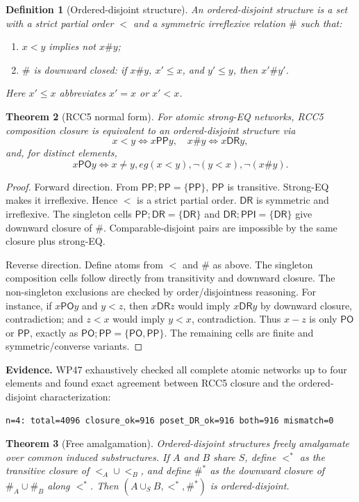 \documentclass[11pt]{article}
\newtheorem{theorem}{Theorem}[section]
\newtheorem{definition}[theorem]{Definition}
\newcommand{\PP}{\mathsf{PP}}
\newcommand{\PPI}{\mathsf{PPI}}
\newcommand{\PO}{\mathsf{PO}}
\newcommand{\DR}{\mathsf{DR}}
\begin{document}
\begin{definition}[Ordered-disjoint structure]
An ordered-disjoint structure is a set with a strict partial order $<$ and a symmetric irreflexive relation $\#$ such that:
\begin{enumerate}
\item $x<y$ implies not $x\#y$;
\item $\#$ is downward closed: if $x\#y$, $x'\le x$, and $y'\le y$, then $x'\#y'$.
\end{enumerate}
Here $x'\le x$ abbreviates $x'=x$ or $x'<x$.
\end{definition}

\begin{theorem}[RCC5 normal form]\label{thm:normal-form}
For atomic strong-EQ networks, RCC5 composition closure is equivalent to an ordered-disjoint structure via
\[
x<y \iff x\PP y,
\quad
x\#y\iff x\DR y,
\]
and, for distinct elements,
\[
x\PO y \iff x\ne y,
eg(x<y),\neg(y<x),\neg(x\#y).
\]
\end{theorem}

\begin{proof}
Forward direction.  From $\PP;\PP=\{\PP\}$, $\PP$ is transitive.  Strong-EQ makes it irreflexive.  Hence $<$ is a strict partial order.  $\DR$ is symmetric and irreflexive.  The singleton cells $\PP;\DR=\{\DR\}$ and $\DR;\PPI=\{\DR\}$ give downward closure of $\#$.  Comparable-disjoint pairs are impossible by the same closure plus strong-EQ.

Reverse direction.  Define atoms from $<$ and $\#$ as above.  The singleton composition cells follow directly from transitivity and downward closure.  The non-singleton exclusions are checked by order/disjointness reasoning.  For instance, if $x\PO y$ and $y<z$, then $x\DR z$ would imply $x\DR y$ by downward closure, contradiction; and $z<x$ would imply $y<x$, contradiction.  Thus $x-z$ is only $\PO$ or $\PP$, exactly as $\PO;\PP=\{\PO,\PP\}$.  The remaining cells are finite and symmetric/converse variants.
\end{proof}

\noindent\textbf{Evidence.} WP47 exhaustively checked all complete atomic networks up to four elements and found exact agreement between RCC5 closure and the ordered-disjoint characterization:
\begin{Verbatim}[fontsize=\small]
n=4: total=4096 closure_ok=916 poset_DR_ok=916 both=916 mismatch=0
\end{Verbatim}

\begin{theorem}[Free amalgamation]
Ordered-disjoint structures freely amalgamate over common induced substructures.  If $A$ and $B$ share $S$, define $<^*$ as the transitive closure of $<_A\cup <_B$, and define $\#^*$ as the downward closure of $\#_A\cup \#_B$ along $<^*$.  Then $(A\cup_S B,<^*,\#^*)$ is ordered-disjoint.
\end{theorem}
\end{document}
